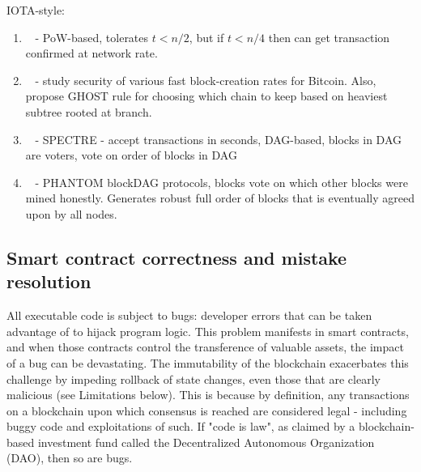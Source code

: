 IOTA-style:
\begin{enumerate}
\item~\cite{EC:PasShi18} - PoW-based, tolerates $t<n/2$, but if $t<n/4$ then can get transaction confirmed at network rate.
\item ~\cite{FC:SomZoh15} - study security of various fast block-creation rates for Bitcoin.  Also, propose GHOST rule for choosing which chain to keep based on heaviest subtree rooted at branch.
\item ~\cite{ePrint:SomLewZoh16} - SPECTRE - accept transactions in seconds, DAG-based, blocks in DAG are voters, vote on order of blocks in DAG
\item ~\cite{eprint:SomZoh18} - PHANTOM blockDAG protocols, blocks vote on which other blocks were mined honestly.  Generates robust full order of blocks that is eventually agreed upon by all nodes.
\end{enumerate}

\subsection{Smart contract correctness and mistake resolution}
All executable code is subject to bugs: developer errors that can be taken advantage of to hijack program logic. This problem manifests in smart contracts, and when those contracts control the transference of valuable assets, the impact of a bug can be devastating. The immutability of the blockchain exacerbates this challenge by impeding rollback of state changes, even those that are clearly malicious (see Limitations below). This is because by definition, any transactions on a blockchain upon which consensus is reached are considered legal - including buggy code and exploitations of such. If "code is law", as claimed by a blockchain-based investment fund called the Decentralized Autonomous Organization (DAO), then so are bugs. 

